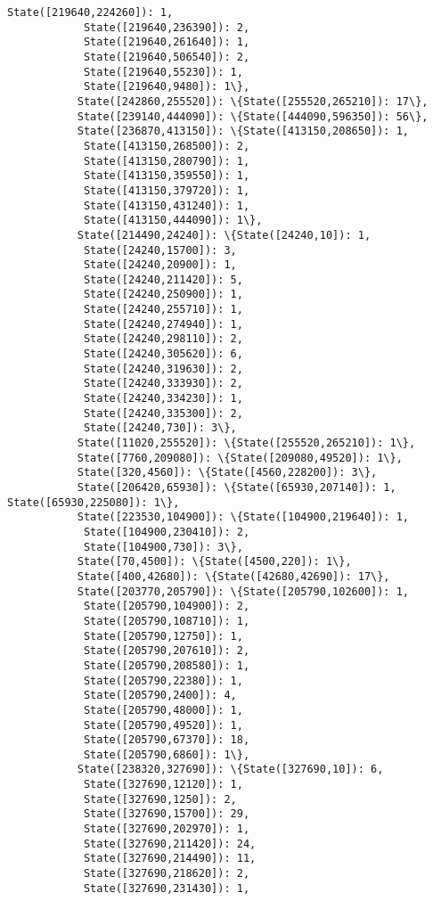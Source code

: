 \documentclass[11pt]{article}
\begin{document}
\begin{Verbatim}[commandchars=\\\{\}]
            State([219640,224260]): 1,
            State([219640,236390]): 2,
            State([219640,261640]): 1,
            State([219640,506540]): 2,
            State([219640,55230]): 1,
            State([219640,9480]): 1\},
           State([242860,255520]): \{State([255520,265210]): 17\},
           State([239140,444090]): \{State([444090,596350]): 56\},
           State([236870,413150]): \{State([413150,208650]): 1,
            State([413150,268500]): 2,
            State([413150,280790]): 1,
            State([413150,359550]): 1,
            State([413150,379720]): 1,
            State([413150,431240]): 1,
            State([413150,444090]): 1\},
           State([214490,24240]): \{State([24240,10]): 1,
            State([24240,15700]): 3,
            State([24240,20900]): 1,
            State([24240,211420]): 5,
            State([24240,250900]): 1,
            State([24240,255710]): 1,
            State([24240,274940]): 1,
            State([24240,298110]): 2,
            State([24240,305620]): 6,
            State([24240,319630]): 2,
            State([24240,333930]): 2,
            State([24240,334230]): 1,
            State([24240,335300]): 2,
            State([24240,730]): 3\},
           State([11020,255520]): \{State([255520,265210]): 1\},
           State([7760,209080]): \{State([209080,49520]): 1\},
           State([320,4560]): \{State([4560,228200]): 3\},
           State([206420,65930]): \{State([65930,207140]): 1, State([65930,225080]): 1\},
           State([223530,104900]): \{State([104900,219640]): 1,
            State([104900,230410]): 2,
            State([104900,730]): 3\},
           State([70,4500]): \{State([4500,220]): 1\},
           State([400,42680]): \{State([42680,42690]): 17\},
           State([203770,205790]): \{State([205790,102600]): 1,
            State([205790,104900]): 2,
            State([205790,108710]): 1,
            State([205790,12750]): 1,
            State([205790,207610]): 2,
            State([205790,208580]): 1,
            State([205790,22380]): 1,
            State([205790,2400]): 4,
            State([205790,48000]): 1,
            State([205790,49520]): 1,
            State([205790,67370]): 18,
            State([205790,6860]): 1\},
           State([238320,327690]): \{State([327690,10]): 6,
            State([327690,12120]): 1,
            State([327690,1250]): 2,
            State([327690,15700]): 29,
            State([327690,202970]): 1,
            State([327690,211420]): 24,
            State([327690,214490]): 11,
            State([327690,218620]): 2,
            State([327690,231430]): 1,

\end{Verbatim}
\end{document}
